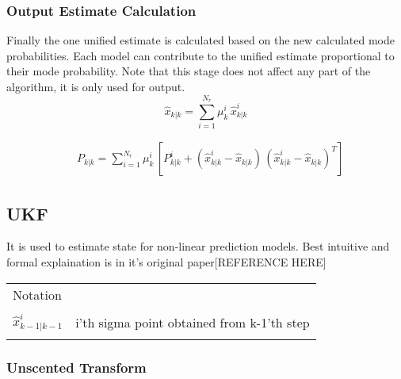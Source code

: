 \documentclass[peerreview]{IEEEtran}
\begin{document}
\subsubsection{Output Estimate Calculation}
Finally the one unified estimate is calculated based on the new calculated mode probabilities. Each model can contribute to the unified estimate proportional to their mode probability. Note that this stage does not affect any part of the algorithm, it is only used for output.
\begin{equation}
\hat{x}_{k|k} = \sum\limits_{i=1}^{N_r} \mu_k^i \, \hat{x}_{k|k}^i
\end{equation}

\begin{equation}
\begin{aligned}
&P_{k|k} = \sum\limits_{i=1}^{N_r} \mu_k^i \, 
[ P_{k|k}^i +   (\hat{x}_{k|k}^i - \hat{x}_{k|k}) \, (\hat{x}_{k|k}^i - \hat{x}_{k|k})^T]
\end{aligned}
\end{equation}


\subsection{UKF}

It is used to estimate state for non-linear prediction models. Best intuitive and formal explaination is in it's original paper[REFERENCE HERE] \\

\vspace{10px}

\begin{center}

\begin{tabularx}{0.4\textwidth }{@{}p{}X@{}}
\toprule
  Notation \\ \\
  $\hat{x}_{k-1|k-1}^i$ & i'th sigma point obtained from k-1'th step \\ \\

  
 
\bottomrule
\end{tabularx}

\end{center}

\label{tbl:UKF Notation Table}


\vspace{10px}

\subsubsection{Unscented Transform}
\end{document}
